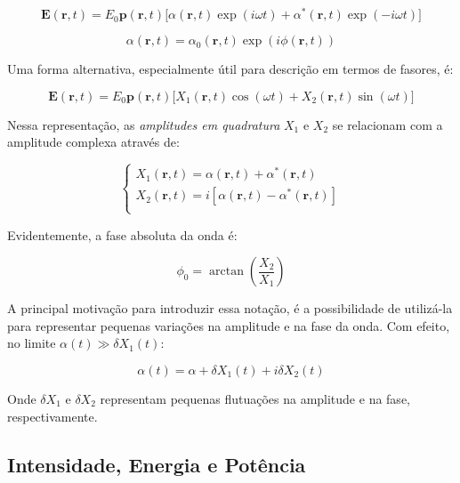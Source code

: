 \documentclass[12pt,a4paper]{report}
\begin{document}
\begin{equation}
    \textbf{E}(\textbf{r},t)=E_0\textbf{p}(\textbf{r},t)\bigl[\alpha(\textbf{r},t)\exp(i\omega t)+\alpha^*(\textbf{r},t)\exp(-i\omega t)\bigr]
\end{equation}

\begin{equation}
    \alpha(\textbf{r},t)=\alpha_0(\textbf{r},t)\exp(i\phi(\textbf{r},t))
\end{equation}

Uma forma alternativa, especialmente útil para descrição em termos de fasores, é:

\begin{equation}
    \textbf{E}(\textbf{r},t)=E_0\textbf{p}(\textbf{r},t)\bigl[X_1(\textbf{r},t)\cos(\omega t)+X_2(\textbf{r},t)\sin(\omega t)\bigr]
\end{equation}

Nessa representação, as \textit{amplitudes em quadratura} $X_1$ e $X_2$ se relacionam com a amplitude complexa através de:

\begin{equation}
    \begin{cases}
        X_1(\textbf{r},t)=\alpha(\textbf{r},t)+\alpha^*(\textbf{r},t)\\
        X_2(\textbf{r},t)=i[\alpha(\textbf{r},t)-\alpha^*(\textbf{r},t)]\\
    \end{cases}
\end{equation}

Evidentemente, a fase absoluta da onda é:

\begin{equation}
    \phi_0=\arctan(\frac{X_2}{X_1})
\end{equation}

A principal motivação para introduzir essa notação, é a possibilidade de utilizá-la para representar pequenas variações na amplitude e na fase da onda. Com efeito, no limite $\alpha(t)\gg \delta X_1(t)$:

\begin{equation}
    \alpha(t)=\alpha+\delta X_1(t)+i\delta X_2(t)
\end{equation}

Onde $\delta X_1$ e $\delta X_2$ representam pequenas flutuações na amplitude e na fase, respectivamente.

\subsection{Intensidade, Energia e Potência}
\end{document}
